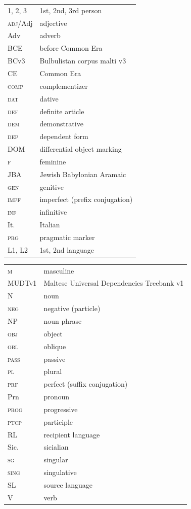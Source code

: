 \documentclass[output=paper]{langsci/langscibook}
\begin{document}
\begin{tabularx}{.5\textwidth}{@{}lQ@{}}
\textsc{1, 2, 3} & 1st, 2nd, 3rd person \\
\textsc{adj}/Adj & adjective \\
Adv & adverb \\
BCE & before Common Era \\
\textsc BCv3 & Bulbulistan corpus malti v3 \\
CE & Common Era \\
\textsc{comp} & complementizer \\
\textsc{dat} & dative \\
\textsc{def} & definite article \\
\textsc{dem} & demonstrative \\
\textsc{dep} & dependent form \\
DOM & differential object marking \\
\textsc{f} & feminine \\
JBA & Jewish Babylonian Aramaic \\
\textsc{gen} & genitive \\
\textsc{impf} & imperfect (prefix conjugation) \\
\textsc{inf} & infinitive \\
It. & Italian \\
\textsc{prg} & pragmatic marker \\
\textsc{L1, L2} & 1st, 2nd language \\
\end{tabularx}%
\begin{tabularx}{.5\textwidth}{@{}lQ@{}}
\textsc{m} & masculine \\
MUDTv1 & Maltese Universal Dependencies Treebank v1 \\
N & noun \\
\textsc{neg} & negative (particle) \\
NP & noun phrase\\
\textsc{obj} & object \\
\textsc{obl} & oblique \\
\textsc{pass} & passive \\
\textsc{pl} & plural \\
\textsc{prf} & perfect (suffix conjugation) \\
Prn & pronoun \\
\textsc{prog} & progressive \\
\textsc{ptcp} & participle \\
RL & recipient language \\
Sic. & sicialian \\
\textsc{sg} & singular \\
\textsc{sing} & singulative \\
SL & source language \\
V & verb \\
\end{tabularx}%
\end{document}
